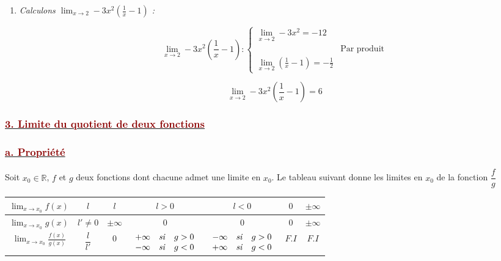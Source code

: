 \documentclass[12pt,a4paper]{article}
\begin{document}
\begin{enumerate}
    \vspace{0.2cm}
    \textit{C'est une Forme Indéterminée (F.I) ; on ne peut pas conclure directement.}

    \vspace{0.4cm}

    \item \textit{Calculons $\displaystyle \lim_{x \to 2} -3x^2 \left(\frac{1}{x} - 1\right)$ :}
    
    \vspace{0.2cm}
    
    \[
    \lim_{x \to 2} -3x^2 \left(\frac{1}{x} - 1\right) :
    \begin{cases}
    \displaystyle \lim_{x \to 2} -3x^2 = -12 \\
    & \text{Par produit} \\
    \displaystyle \lim_{x \to 2} \left(\frac{1}{x} - 1\right) = -\frac{1}{2}
    \end{cases}
    \]
    
    \[
    \boxed{\lim_{x \to 2} -3x^2 \left(\frac{1}{x} - 1\right) = 6}
    \]
\end{enumerate}

\subsubsection*{\underline{\textcolor{darkred}{ 3. Limite du quotient de deux fonctions }}}
\subsubsection*{\underline{\textcolor{darkred}{ a. Propriété }}}

Soit $x_0 \in \mathbb{R}$, $f$ et $g$ deux fonctions dont chacune admet une limite en $x_0$. Le tableau suivant donne les limites en $x_0$ de la fonction $\dfrac{f}{g}$

\vspace{0.4cm}

\centering
\renewcommand{\arraystretch}{1.5}
\begin{tabular}{|c|c|c|c|c|c|c|}
    \hline
    $\displaystyle \lim_{x \to x_0} f(x)$ & $l$ & $l$ & $l > 0$ & $l < 0$ & $0$ & $\pm\infty$ \\
    \hline
    $\displaystyle \lim_{x \to x_0} g(x)$ & $l' \neq 0$ & $\pm\infty$ & $0$ & $0$ & $0$ & $\pm\infty$ \\
    \hline
    $\displaystyle \lim_{x \to x_0} \frac{f(x)}{g(x)}$ & $\dfrac{l}{l'}$ & $0$ & 
    $\begin{array}{ccc} +\infty & \text{\textit{si}} & g > 0 \\ -\infty & \text{\textit{si}} & g < 0 \end{array}$ & 
    $\begin{array}{ccc} -\infty & \text{\textit{si}} & g > 0 \\ +\infty & \text{\textit{si}} & g < 0 \end{array}$ & 
    $F.I$ & $F.I$ \\
    \hline
\end{tabular}
\end{document}
